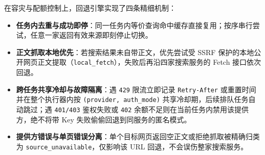 在容灾与配额控制上，回退引擎实现了四条精细机制：
\begin{itemize}
  \item \textbf{任务内去重与成功即停}：同一任务内等价查询命中缓存直接复用；按序串行尝试，任意一家返回有效来源即刻停止切换。
  \item \textbf{正文抓取本地优先}：若搜索结果未自带正文，优先尝试受 SSRF 保护的本地公开网页正文提取（\texttt{local\_fetch}），失败后再沿四家搜索服务的 Fetch 接口依次回退。
  \item \textbf{跨任务共享冷却与故障隔离}：遇 \texttt{429} 限流立即记录 \texttt{Retry-After} 或重置时间并在整个执行器内按 \texttt{(provider, auth\_mode)} 共享冷却期，后续排队任务自动跳过；遇 \texttt{401/403} 鉴权失败或 \texttt{402} 余额不足则在当前任务内禁用该提供方，绝不将带 Key 失败偷偷回退到同服务的匿名模式。
  \item \textbf{提供方错误与单页错误分离}：单个目标网页返回空正文或拒绝抓取被精确归类为 \texttt{source\_unavailable}，仅影响该 URL 回退，不会误伤整家搜索服务。
\end{itemize}
